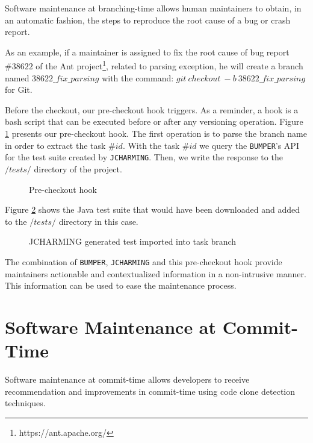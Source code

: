 Software maintenance at branching-time allows human maintainers to obtain, in an automatic fashion, the steps to reproduce the root cause of a bug or crash report.

As an example, if a maintainer is assigned to fix the root cause of bug report $\#38622$ of the Ant project\footnote{https://ant.apache.org/}, related to parsing exception, he will create a branch named $38622\_fix\_parsing$ with the command: $git~checkout~-b~38622\_fix\_parsing$ for Git.

Before the checkout, our pre-checkout hook triggers.
As a reminder, a hook is a bash script that can be executed before or after any versioning operation.
Figure \ref{fig:pre-checkout-hook} presents our pre-checkout hook.
The first operation is to parse the branch name in order to extract the task $\#id$.
With the task $\#id$ we query the {\tt BUMPER}'s API for the test suite created by {\tt JCHARMING}.
Then, we write the response to the $/tests/$ directory of the project.

\begin{figure}
  
  \caption{Pre-checkout hook
  \label{fig:pre-checkout-hook}}
\end{figure}

Figure \ref{fig:jcharming-imported} shows the Java test suite that would have been downloaded and added to the $/tests/$ directory in this case.

\begin{figure}
  
  \caption{JCHARMING generated test imported into task branch
  \label{fig:jcharming-imported}}
\end{figure}

The combination of {\tt BUMPER}, {\tt JCHARMING} and this pre-checkout hook provide maintainers actionable and contextualized information in a non-intrusive manner.
This information can be used to ease the maintenance process.

\section{Software Maintenance at Commit-Time}

Software maintenance at commit-time allows developers to receive recommendation and improvements in commit-time using code clone detection techniques.

